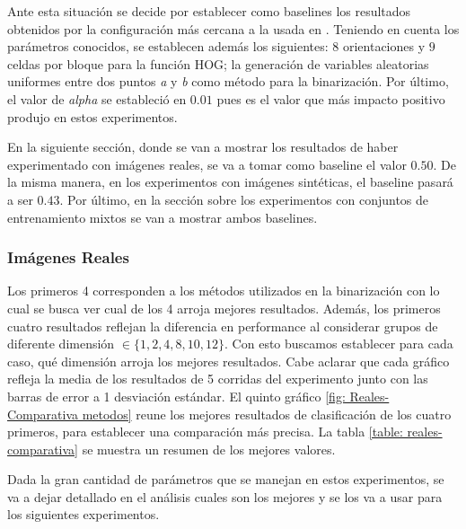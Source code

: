 	Ante esta situación se decide por establecer como baselines los resultados obtenidos por la configuración más cercana a la usada en \cite{wang}. Teniendo en cuenta los parámetros conocidos, se establecen además los siguientes: $8$ orientaciones y $9$ celdas por bloque para la función HOG; la generación de variables aleatorias uniformes entre dos puntos \textit{a} y \textit{b} como método para la binarización. Por último, el valor de \textit{alpha} se estableció en $0.01$ pues es el valor que más impacto positivo produjo en estos experimentos.

	En la siguiente sección, donde se van a mostrar los resultados de haber experimentado con imágenes reales, se va a tomar como baseline el valor $0.50$. De la misma manera, en los experimentos con imágenes sintéticas, el baseline pasará a ser $0.43$. Por último, en la sección sobre los experimentos con conjuntos de entrenamiento mixtos se van a mostrar ambos baselines.

	\subsubsection{Imágenes Reales}

	Los primeros 4 corresponden a los métodos utilizados en la binarización con lo cual se busca ver cual de los 4 arroja mejores resultados. Además, los primeros cuatro resultados reflejan la diferencia en performance al considerar grupos de diferente dimensión $\in \{ 1, 2, 4, 8, 10, 12\}$. Con esto buscamos establecer para cada caso, qué dimensión arroja los mejores resultados. Cabe aclarar que cada gráfico refleja la media de los resultados de 5 corridas del experimento junto con las barras de error a 1 desviación estándar. El quinto gráfico \ref{fig: Reales-Comparativa metodos} reune los mejores resultados de clasificación de los cuatro primeros, para establecer una comparación más precisa. La tabla \ref{table: reales-comparativa} se muestra un resumen de los mejores valores.

	 Dada la gran cantidad de parámetros que se manejan en estos experimentos, se va a dejar detallado en el análisis cuales son los mejores y se los va a usar para los siguientes experimentos.

